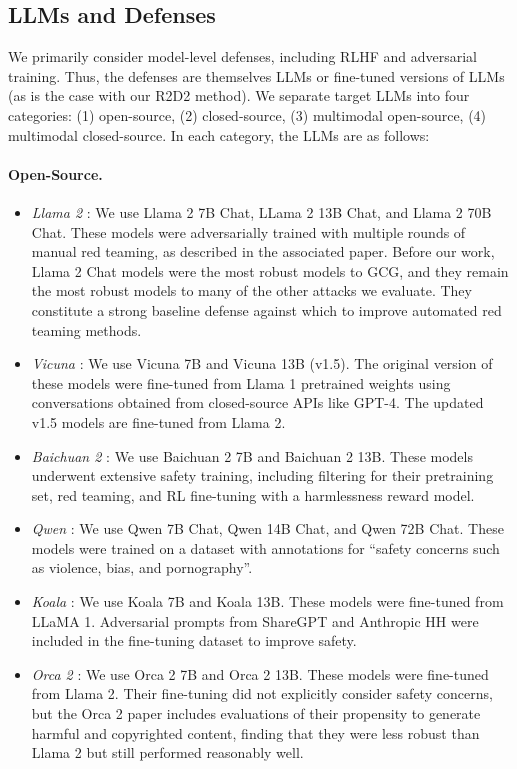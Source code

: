 \subsection{LLMs and Defenses}

We primarily consider model-level defenses, including RLHF and adversarial training. Thus, the defenses are themselves LLMs or fine-tuned versions of LLMs (as is the case with our R2D2 method). We separate target LLMs into four categories: (1) open-source, (2) closed-source, (3) multimodal open-source, (4) multimodal closed-source. In each category, the LLMs are as follows:

\paragraph{Open-Source.}
\begin{itemize}
    \item \textit{Llama 2} \citep{touvron2023llama}: We use Llama 2 7B Chat, LLama 2 13B Chat, and Llama 2 70B Chat. These models were adversarially trained with multiple rounds of manual red teaming, as described in the associated paper. Before our work, Llama 2 Chat models were the most robust models to GCG, and they remain the most robust models to many of the other attacks we evaluate. They constitute a strong baseline defense against which to improve automated red teaming methods.
    \item \textit{Vicuna} \citep{vicuna2023}: We use Vicuna 7B and Vicuna 13B (v1.5). The original version of these models were fine-tuned from Llama 1 pretrained weights using conversations obtained from closed-source APIs like GPT-4. The updated v1.5 models are fine-tuned from Llama 2.
    \item \textit{Baichuan 2} \citep{yang2023baichuan}: We use Baichuan 2 7B and Baichuan 2 13B. These models underwent extensive safety training, including filtering for their pretraining set, red teaming, and RL fine-tuning with a harmlessness reward model.
    \item \textit{Qwen} \citep{bai2023qwen}: We use Qwen 7B Chat, Qwen 14B Chat, and Qwen 72B Chat. These models were trained on a dataset with annotations for ``safety concerns such as violence, bias, and pornography''.
    \item \textit{Koala} \citep{koala_blogpost_2023}: We use Koala 7B and Koala 13B. These models were fine-tuned from LLaMA 1. Adversarial prompts from ShareGPT and Anthropic HH were included in the fine-tuning dataset to improve safety.
    \item \textit{Orca 2} \citep{mitra2023orca}: We use Orca 2 7B and Orca 2 13B. These models were fine-tuned from Llama 2. Their fine-tuning did not explicitly consider safety concerns, but the Orca 2 paper includes evaluations of their propensity to generate harmful and copyrighted content, finding that they were less robust than Llama 2 but still performed reasonably well.

\end{itemize}
